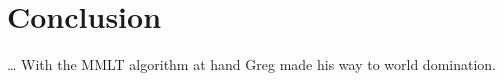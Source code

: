 \chapter{Conclusion}
\ldots{}
With the \gls{MMLT} algorithm at hand Greg made his way to world domination.
